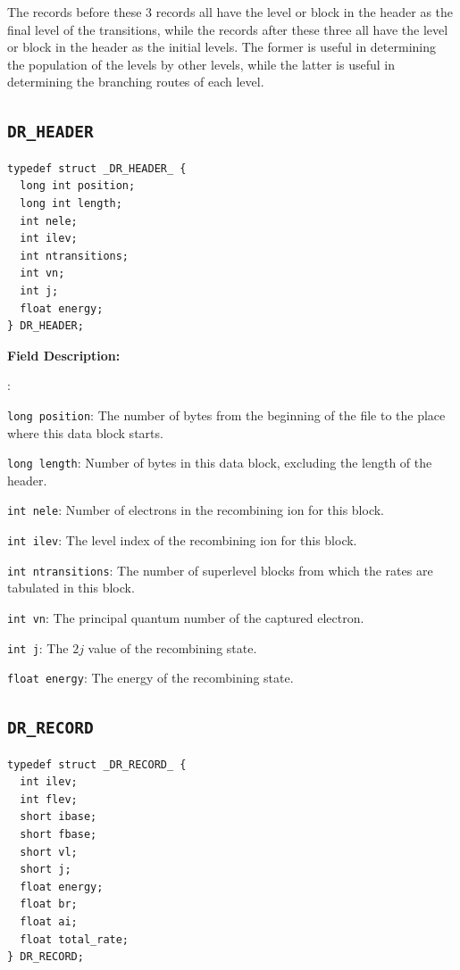 \documentclass[twoside,letterpaper]{refrep}
\newenvironment{dbdesc}{\textbf{Field Description:} \begin{list}
	{:}{\setlength{\labelwidth}{2in}
	   \setlength{\leftmargin}{2in}
	   \setlength{\labelsep}{0.1in}
	   \setlength{\rightmargin}{0.2in}}}
	{\end{list}}
\begin{document}
The records before these 3 records all have the level or block in the header
as the final level of the transitions, while the records after these three all
have the level or block in the header as the initial levels. The former is
useful in determining the population of the levels by other levels, while the
latter is useful in determining the branching routes of each level.

\subsection{\texttt{DR\_HEADER}}
\begin{verbatim}	
typedef struct _DR_HEADER_ {
  long int position;
  long int length;
  int nele;
  int ilev;
  int ntransitions;
  int vn;
  int j;
  float energy;
} DR_HEADER;
\end{verbatim}

\begin{dbdesc}
\item[\texttt{long position}:] The number of bytes from the beginning of the
file to the place where this data block starts.
\item[\texttt{long length}:] Number of bytes in this data block, excluding the
length of the header.
\item[\texttt{int nele}:] Number of electrons in the recombining ion for this
block. 
\item[\texttt{int ilev}:] The level index of the recombining ion for this
block. 
\item[\texttt{int ntransitions}:] The number of superlevel blocks from which
the rates are tabulated in this block.
\item[\texttt{int vn}:] The principal quantum number of the captured electron.
\item[\texttt{int j}:] The $2j$ value of the recombining state.
\item[\texttt{float energy}:] The energy of the recombining state.
\end{dbdesc}

\subsection{\texttt{DR\_RECORD}}
\begin{verbatim}
typedef struct _DR_RECORD_ {
  int ilev;
  int flev;
  short ibase;
  short fbase;
  short vl;
  short j;
  float energy;
  float br;
  float ai;
  float total_rate;
} DR_RECORD;
\end{verbatim}
\end{document}
